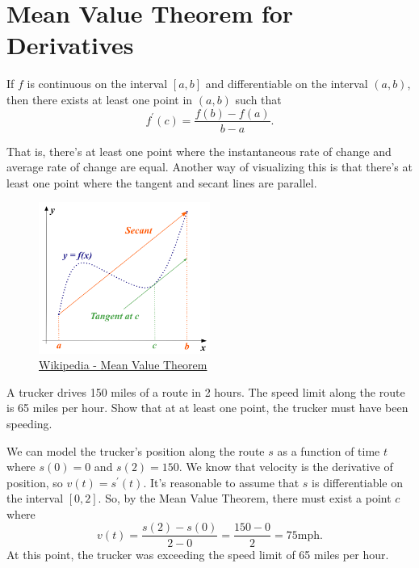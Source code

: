 \section{Mean Value Theorem for Derivatives}
\begin{theorem}
	If $f$ is continuous on the interval $[a,b]$ and differentiable on the interval $(a,b)$, then there exists at least one point in $(a,b)$ such that
	\begin{equation*}
		f^\prime(c) = \frac{f(b)-f(a)}{b-a}.
	\end{equation*}
\end{theorem}

That is, there's at least one point where the instantaneous rate of change and average rate of change are equal.
Another way of visualizing this is that there's at least one point where the tangent and secant lines are parallel.

\begin{figure}[H]
	\label{mvt}
	\centering
	\includegraphics[width = 0.5\textwidth]{./applications_derivative/mvt.png}
	\caption{\hyperref{https://en.wikipedia.org/wiki/Mean\_value\_theorem}{}{}{Wikipedia - Mean Value Theorem}}
\end{figure}

\begin{example}
	A trucker drives 150 miles of a route in 2 hours.
	The speed limit along the route is 65 miles per hour.
	Show that at at least one point, the trucker must have been speeding.
\end{example}
\begin{answer}
	We can model the trucker's position along the route $s$ as a function of time $t$ where $s(0)=0$ and $s(2)=150$.
	We know that velocity is the derivative of position, so $v(t) = s^\prime(t)$.
	It's reasonable to assume that $s$ is differentiable on the interval $[0,2]$.
	So, by the Mean Value Theorem, there must exist a point $c$ where
	\begin{equation*}
		v(t) = \frac{s(2)-s(0)}{2-0} = \frac{150-0}{2} = 75\text{mph}.
	\end{equation*}
	At this point, the trucker was exceeding the speed limit of 65 miles per hour.
\end{answer}

